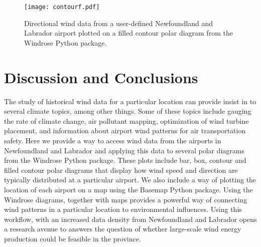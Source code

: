 \documentclass{article}
\begin{document}
\begin{figure}[h!]
\centering
\texttt{[image: contourf.pdf]}
\caption{Directional wind data from a user-defined Newfoundland and Labrador airport plotted on a filled contour polar diagram from the Windrose Python package.}
\label{contourf}
\end{figure}

\clearpage
\section{Discussion and Conclusions}\label{Discussion_and_conclusions}
The study of historical wind data for a particular location can provide insist in to several climate topics, among other things. Some of these topics include gauging the rate of climate change, air 
pollutant mapping, optimization of wind turbine placement, and information about airport wind patterns for air transportation safety. Here we provide a way to access wind data from the airports in 
Newfoundland and Labrador and applying this data to several polar diagrams from the Windrose Python package. These plots include bar, box, contour and filled contour polar diagrams that display how wind 
speed and direction are typically distributed at a particular airport. We also include a way of plotting the location of each airport on a map using the Basemap Python package. Using the Windrose 
diagrams, together with maps provides a powerful way of connecting wind patterns in a particular location to environmental influences. Using this workflow, with an increased data density from 
Newfoundland and Labrador opens a research avenue to answers the question of whether large-scale wind energy production could be feasible in the province.

\clearpage 


\end{document}
